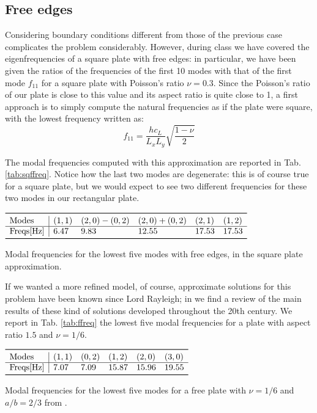 \documentclass[a4paper]{article}
\begin{document}
\subsection{Free edges}

Considering boundary conditions different from those of the previous case complicates the problem considerably. However, during class we have covered the eigenfrequencies of a square plate with free edges: in particular, we have been given the ratios of the frequencies of the first 10 modes with that of the first mode $f_{11}$ for a square plate with Poisson's ratio $\nu = 0.3$. Since the Poisson's ratio of our plate is close to this value and its aspect ratio is quite close to 1, a first approach is to simply compute the natural frequencies as if the plate were square, with the lowest frequency written as:
$$ f_{11} = \frac{hc_L}{L_x L_y} \sqrt{\frac{1-\nu}{2}} $$

The modal frequencies computed with this approximation are reported in Tab. \ref{tab:sqffreq}. Notice how the last two modes are degenerate: this is of course true for a square plate, but we would expect to see two different frequencies for these two modes in our rectangular plate.


\begin{table}[h]
	\centering
	$\begin{array}{l|lllll}
		\toprule
		\text{Modes} & (1,1) & (2,0) - (0,2) & (2,0) + (0,2) & (2,1) & (1,2) \\
		\hline
		\text{Freqs[Hz]} & 6.47 &  9.83 & 
		12.55 &  17.53  & 17.53 \\
		\bottomrule
	\end{array}$
	\caption{Modal frequencies for the lowest five modes with free edges, in the square plate approximation.}
	\label{tab:sqffreq}
\end{table}

If we wanted a more refined model, of course, approximate solutions for this problem have been known since Lord Rayleigh; in \cite{leissa} we find a review of the main results of these kind of solutions developed throughout the 20th century. We report in Tab. \ref{tab:ffreq} the lowest five modal frequencies for a plate with aspect ratio $1.5$ and $\nu = 1/6 $.

\begin{table}[h]
	\centering
	$\begin{array}{l|lllll}
		\toprule
		\text{Modes} & (1,1) & (0,2) & (1,2) & (2,0) & (3,0) \\
		\hline
		\text{Freqs[Hz]} & 7.07 &  7.09 & 
		15.87 &  15.96  & 19.55	\\
		\bottomrule
	\end{array}$
	\caption{Modal frequencies for the lowest five modes for a free plate with $\nu = 1/6$ and $a/b = 2/3$ from \cite{leissa}.}
	\label{tab:ffreq}
\end{table}
\end{document}

